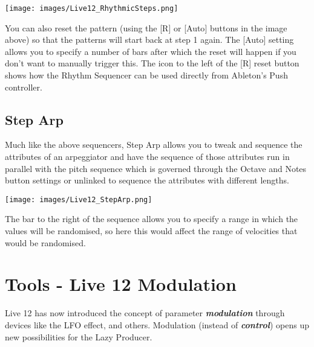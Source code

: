 \documentclass[
  12pt,
  letterpaper,
  oneside,
  open=any]{scrbook}
\begin{document}
\texttt{[image: images/Live12\_RhythmicSteps.png]}

You can also reset the pattern (using the {[}R{]} or {[}Auto{]} buttons
in the image above) so that the patterns will start back at step 1
again. The {[}Auto{]} setting allows you to specify a number of bars
after which the reset will happen if you don't want to manually trigger
this. The icon to the left of the {[}R{]} reset button shows how the
Rhythm Sequencer can be used directly from Ableton's Push controller.

\section{Step Arp}\label{step-arp}

Much like the above sequencers, Step Arp allows you to tweak and
sequence the attributes of an arpeggiator and have the sequence of those
attributes run in parallel with the pitch sequence which is governed
through the Octave and Notes button settings or unlinked to sequence the
attributes with different lengths.

\texttt{[image: images/Live12\_StepArp.png]}

The bar to the right of the sequence allows you to specify a range in
which the values will be randomised, so here this would affect the range
of velocities that would be randomised.


\chapter{Tools - Live 12
Modulation}\label{Chapter-032-Tools-Live12_Modulation}

Live 12 has now introduced the concept of parameter
\textbf{\emph{modulation}} through devices like the LFO effect, and
others. Modulation (instead of \textbf{\emph{control}}) opens up new
possibilities for the Lazy Producer.
\end{document}

